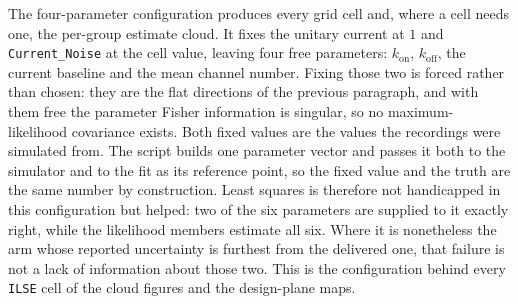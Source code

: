 The four-parameter configuration produces every grid cell and, where a cell needs one, the
per-group estimate cloud. It fixes the unitary current at $1$ and \texttt{Current\_Noise} at
the cell value, leaving four free parameters: $k_{\mathrm{on}}$, $k_{\mathrm{off}}$,
the current baseline and the mean channel number. Fixing those two is forced rather
than chosen: they are the flat directions of the previous paragraph, and with them free
the parameter Fisher information is singular, so no maximum-likelihood covariance
exists. Both fixed values are the values the recordings were simulated from. The script
builds one parameter vector and passes it both to the simulator and to the fit as its
reference point, so the fixed value and the truth are the same number by construction.
Least squares is therefore not handicapped in this configuration but helped: two of the
six parameters are supplied to it exactly right, while the likelihood members estimate
all six. Where it is nonetheless the arm whose reported uncertainty is furthest from
the delivered one, that failure is not a lack of information about those two. %
This is
the configuration behind every \texttt{ILSE} cell of the cloud figures and the design-plane maps.


